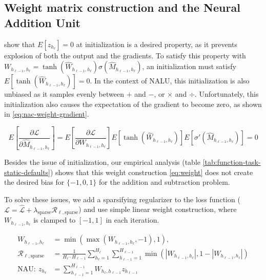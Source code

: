 \subsection{Weight matrix construction  and the Neural Addition Unit}\label{sssec:weight}

\citet{glorot-initialization} show that $E[z_{h_\ell}] = 0$ at initialization is a desired property, as it prevents explosion of both the output and the gradients. To satisfy this property with $W_{h_{\ell-1},h_\ell} = \tanh(\hat{W}_{h_{\ell-1},h_\ell}) \sigma(\hat{M}_{h_{\ell-1},h_\ell})$, an initialization must satisfy $E[\tanh(\hat{W}_{h_{\ell-1},h_\ell})] = 0$. In the context of NALU, this initialization is also unbiased as it samples evenly between $+$ and $-$, or $\times$ and $\div$. Unfortunately, this initialization also causes the expectation of the gradient to become zero, as shown in \eqref{eq:nac-weight-gradient}.

\begin{equation}
E\left[\frac{\partial \mathcal{L}}{\partial \hat{M}_{h_{\ell-1},h_\ell}}\right] = E\left[\frac{\partial \mathcal{L}}{\partial W_{h_{\ell-1},h_\ell}}\right] E\left[\tanh(\hat{W}_{h_{\ell-1},h_\ell})\right] E\left[\sigma'(\hat{M}_{h_{\ell-1},h_\ell})\right] = 0
\label{eq:nac-weight-gradient}
\end{equation}

Besides the issue of initialization, our empirical analysis (table \ref{tab:function-task-static-defaults}) shows that this weight construction \eqref{eq:weight} does not create the desired bias for $\{-1, 0, 1\}$ for the addition and subtraction problem.

To solve these issues, we add a sparsifying regularizer to the loss function ($\mathcal{L} = \hat{\mathcal{L}} + \lambda_{\mathrm{sparse}} \mathcal{R}_{\ell,\mathrm{sparse}}$) and use simple linear weight construction, where $W_{h_{\ell-1},h_\ell}$ is clamped to $[-1, 1]$ in each iteration.

\begin{align}
W_{h_{\ell-1},h_\ell} &= \min(\max(W_{h_{\ell-1},h_\ell}, -1), 1), \\
\mathcal{R}_{\ell,\mathrm{sparse}} &= \frac{1}{H_\ell \cdot H_{\ell-1}} \sum_{h_\ell=1}^{H_\ell} \sum_{h_{\ell-1}=1}^{H_{\ell-1}} \min\left(|W_{h_{\ell-1},h_\ell}|, 1 - \left|W_{h_{\ell-1},h_\ell}\right|\right) \\
\textrm{NAU}:\ z_{h_\ell} &= \sum_{h_{\ell-1}=1}^{H_{\ell-1}} W_{h_{\ell}, h_{\ell-1}} z_{h_{\ell-1}}
\end{align}

